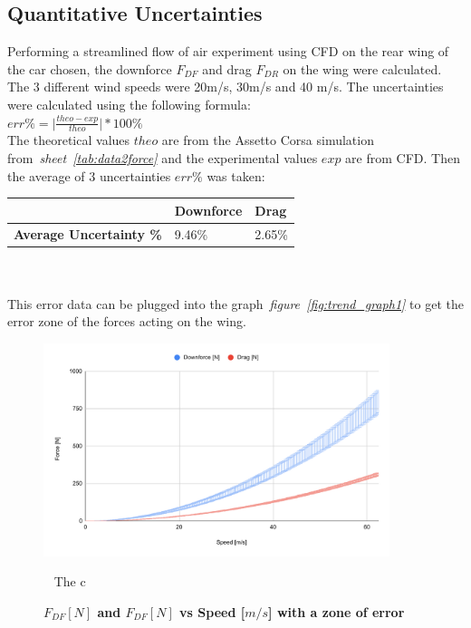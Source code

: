 \documentclass[11pt, a4paper]{article}
\begin{document}
\subsection{Quantitative Uncertainties} \label{sec:uncertainties}
Performing a streamlined flow of air experiment using CFD on the rear wing of the car chosen, the downforce $F_{DF}$ and drag $F_{DR}$ on the wing were calculated. The 3 different wind speeds were 20m/s, 30m/s and 40 m/s. 
The uncertainties were calculated using the following formula:
\\
\begin{math}
    err\%=\big|\frac{theo-exp}{theo}\big| * 100\%
\end{math}
\\
The theoretical values $theo$ are from the Assetto Corsa simulation from~\textit{sheet~\ref{tab:data2force}} and the experimental values $exp$ are from CFD.
Then the average of 3 uncertainties $err\%$ was taken:
\begin{table}[!ht]
    \centering
    \begin{tabular}{|l|l|l|}
    \hline
        \textbf{} & \textbf{Downforce} & \textbf{Drag} \\ \hline
        \textbf{Average Uncertainty \%} & 9.46\% & 2.65\% \\ \hline
    \end{tabular}
\end{table}
\\\\
This error data can be plugged into the graph~\textit{figure~\ref{fig:trend_graph1}} to get the error zone of the forces acting on the wing.
\begin{figure}[H]
    \centering
    \caption{\textbf{$F_{DF} [N]$ and $F_{DF} [N]$ vs Speed [$m/s$] with a zone of error}}
    \includegraphics[width=0.9\textwidth]{graphs/DF_DR_VS_VElocity_error.pdf}
    
~\label{fig:err_graph1}
The c
\end{figure}
\end{document}
